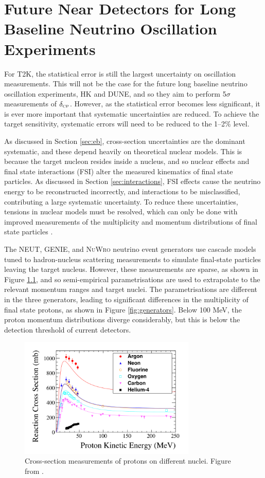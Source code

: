 \chapter{Future Near Detectors for Long Baseline Neutrino Oscillation Experiments}\label{sec:hptpc}

For T2K, the statistical error is still the largest uncertainty on oscillation measurements. This will not be the case for the future long baseline neutrino oscillation experiments, HK and DUNE, and so they aim to perform 5$\sigma$ measurements of $\delta_{\scriptscriptstyle\mathrm{CP}}$. However, as the statistical error becomes less significant, it is ever more important that systematic uncertainties are reduced. To achieve the target sensitivity, systematic errors will need to be reduced to the 1--2$\%$ level.

As discussed in Section \ref{sec:eb}, cross-section uncertainties are the dominant systematic, and these depend heavily on theoretical nuclear models. This is because the target nucleon resides inside a nucleus, and so nuclear effects and final state interactions (FSI) alter the measured kinematics of final state particles. As discussed in Section \ref{sec:interactions}, FSI effects cause the neutrino energy to be reconstructed incorrectly, and interactions to be misclassified, contributing a large systematic uncertainty. To reduce these uncertainties, tensions in nuclear models must be resolved, which can only be done with improved measurements of the multiplicity and momentum distributions of final state particles \cite{nustecscat}.

The \textsc{NEUT}, \textsc{GENIE}, and \textsc{NuWro} \cite{nuwro} neutrino event generators use cascade models tuned to hadron-nucleus scattering measurements to simulate final-state particles leaving the target nucleus. However, these measurements are sparse, as shown in Figure \ref{fig:nucxsec}, and so semi-empirical parametrisations are used to extrapolate to the relevant momentum ranges and target nuclei. The parametrisations are different in the three generators, leading to significant differences in the multiplicity of final state protons, as shown in Figure \ref{fig:generators}. Below 100 MeV, the proton momentum distributions diverge considerably, but this is below the detection threshold of current detectors.

\begin{figure}
\centering
\includegraphics*[width=0.75\textwidth,clip]{figs/nucxsec}
\caption{Cross-section measurements of protons on different nuclei. Figure from \cite{hptpcprop}.}\label{fig:nucxsec}
\end{figure}

